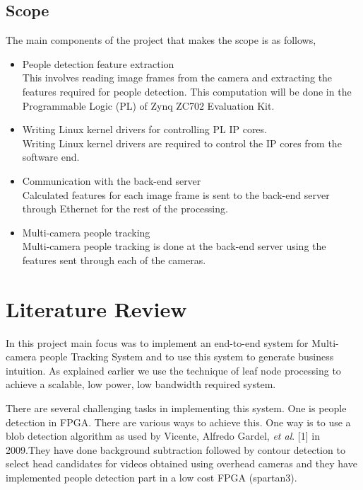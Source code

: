 \documentclass[12pt,a4paper]{report}
\begin{document}
\section{Scope}
The main components of the project that makes the scope is as follows,
\begin{itemize}
\item People detection feature extraction\\
This involves reading image frames from the camera and extracting the features
required for people detection. This computation will be done in the Programmable
Logic (PL) of Zynq ZC702 Evaluation Kit.
\item Writing Linux kernel drivers for controlling PL IP cores.\\
Writing Linux kernel drivers are required to control the IP cores from the software end.
\item Communication with the back-end server \\
Calculated features for each image frame is sent to the back-end server through Ethernet for the rest of the processing.
\item Multi-camera people tracking \\
Multi-camera people tracking is done at the back-end server using the features sent through each of the cameras.


\end{itemize}

\chapter{Literature Review}
In this project main focus was to implement an end-to-end system for Multi-camera people Tracking System and to use this system to generate business intuition. As explained earlier we use the technique of leaf node processing to achieve a scalable, low power, low bandwidth required system.\vspace{0.3cm} 

There are several challenging tasks in implementing this system. One is people detection in FPGA. There are various ways to achieve this. One way is to use a blob detection algorithm as used by Vicente, Alfredo Gardel, \textit{et al}. [1] in 2009.They have done background subtraction followed by contour detection to select head candidates for videos obtained using overhead cameras and they have implemented people detection part in a low cost FPGA (spartan3).\vspace{0.3cm}
\end{document}
